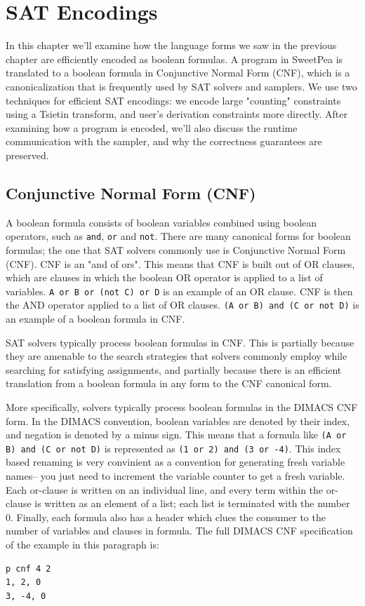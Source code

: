
\chapter{SAT Encodings}

In this chapter we'll examine how the language forms we saw in the previous chapter are efficiently encoded as boolean formulas. A program in SweetPea is translated to a boolean formula in Conjunctive Normal Form (CNF), which is a canonicalization that is frequently used by SAT solvers and samplers. We use two techniques for efficient SAT encodings: we encode large "counting" constraints using a Tsietin transform, and user's derivation constraints more directly. After examining how a program is encoded, we'll also discuss the runtime communication with the sampler, and why the correctness guarantees are preserved.

\section{Conjunctive Normal Form (CNF)}

A boolean formula consists of boolean variables combined using boolean operators, such as \texttt{and}, \texttt{or} and \texttt{not}. There are many canonical forms for boolean formulas; the one that SAT solvers commonly use is Conjunctive Normal Form (CNF). CNF is an "and of ors". This means that CNF is built out of OR clauses, which are clauses in which the boolean OR operator is applied to a list of variables. \texttt{A or B or (not C) or D} is an example of an OR clause. CNF is then the AND operator applied to a list of OR clauses. \texttt{(A or B) and (C or not D)} is an example of a boolean formula in CNF.

SAT solvers typically process boolean formulas in CNF. This is partially because they are amenable to the search strategies that solvers commonly employ while searching for satisfying assignments, and partially because there is an efficient translation from a boolean formula in any form to the CNF canonical form.

More specifically, solvers typically process boolean formulas in the DIMACS CNF form. In the DIMACS convention, boolean variables are denoted by their index, and negation is denoted by a minus sign. This means that a formula like \texttt{(A or B) and (C or not D)} is represented as \texttt{(1 or 2) and (3 or -4)}. This index based renaming is very convinient as a convention for generating fresh variable names-- you just need to increment the variable counter to get a fresh variable. Each or-clause is written on an individual line, and every term within the or-clause is written as an element of a list; each list is terminated with the number 0. Finally, each formula also has a header which clues the consumer to the number of variables and clauses in formula. The full DIMACS CNF specification of the example in this paragraph is:
\begin{verbatim}
p cnf 4 2
1, 2, 0
3, -4, 0
\end{verbatim}

